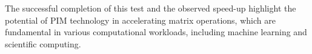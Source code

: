 \documentclass[12pt]{article}
\begin{document}
The successful completion of this test and the observed speed-up highlight the potential of PIM technology in accelerating matrix operations, which are fundamental in various computational workloads, including machine learning and scientific computing.










\newpage


\end{document}
